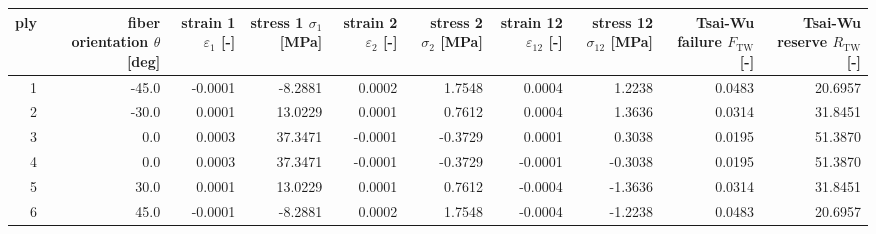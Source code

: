 \begin{tabular}{rrrrrrrrrr}
\toprule
ply & fiber orientation $\theta$ [deg] & strain 1 $\varepsilon_1$ [-] & stress 1 $\sigma_1$ [MPa] & strain 2 $\varepsilon_2$ [-] & stress 2 $\sigma_2$ [MPa] & strain 12 $\varepsilon_{12}$ [-] & stress 12 $\sigma_{12}$ [MPa] & Tsai-Wu failure $F_\mathrm{TW}$ [-] & Tsai-Wu reserve $R_\mathrm{TW}$ [-] \\
\midrule
  1 &                            -45.0 &                      -0.0001 &                   -8.2881 &                       0.0002 &                    1.7548 &                           0.0004 &                        1.2238 &                              0.0483 &                             20.6957 \\
  2 &                            -30.0 &                       0.0001 &                   13.0229 &                       0.0001 &                    0.7612 &                           0.0004 &                        1.3636 &                              0.0314 &                             31.8451 \\
  3 &                              0.0 &                       0.0003 &                   37.3471 &                      -0.0001 &                   -0.3729 &                           0.0001 &                        0.3038 &                              0.0195 &                             51.3870 \\
  4 &                              0.0 &                       0.0003 &                   37.3471 &                      -0.0001 &                   -0.3729 &                          -0.0001 &                       -0.3038 &                              0.0195 &                             51.3870 \\
  5 &                             30.0 &                       0.0001 &                   13.0229 &                       0.0001 &                    0.7612 &                          -0.0004 &                       -1.3636 &                              0.0314 &                             31.8451 \\
  6 &                             45.0 &                      -0.0001 &                   -8.2881 &                       0.0002 &                    1.7548 &                          -0.0004 &                       -1.2238 &                              0.0483 &                             20.6957 \\
\bottomrule
\end{tabular}
